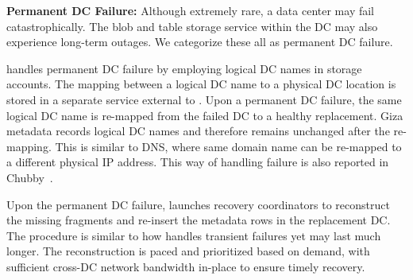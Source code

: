 {\bf Permanent DC Failure:}
Although extremely rare, a data center may fail catastrophically. The blob and
table storage service within the DC may also experience long-term outages. We
categorize these all as permanent DC failure. 

\name handles permanent DC failure by employing logical DC names in storage accounts. The mapping between a logical DC name to a physical DC location is stored in a separate service external to \name. Upon a permanent DC failure, the same logical DC name is re-mapped from the failed DC to a healthy replacement. Giza metadata records logical DC names and therefore remains unchanged after the re-mapping. This is similar to DNS, where same domain name can be re-mapped to a different physical IP address. This way of handling failure is also reported in Chubby~\cite{chubby:osdi06}.

Upon the permanent DC failure, \name launches recovery coordinators to reconstruct the missing fragments and re-insert the metadata rows in the replacement DC. The procedure is similar to how \name handles transient failures yet may last much longer. The reconstruction is paced and prioritized based on demand, with sufficient cross-DC network bandwidth in-place to ensure timely recovery.





